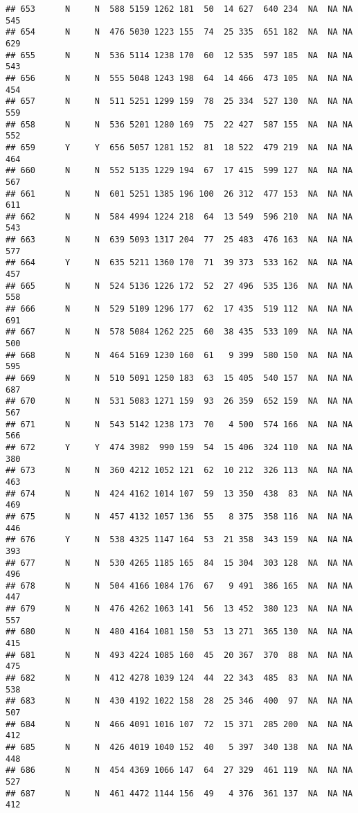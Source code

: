 \documentclass[]{article}
\begin{document}
\begin{verbatim}
## 653      N     N  588 5159 1262 181  50  14 627  640 234  NA  NA NA  545
## 654      N     N  476 5030 1223 155  74  25 335  651 182  NA  NA NA  629
## 655      N     N  536 5114 1238 170  60  12 535  597 185  NA  NA NA  543
## 656      N     N  555 5048 1243 198  64  14 466  473 105  NA  NA NA  454
## 657      N     N  511 5251 1299 159  78  25 334  527 130  NA  NA NA  559
## 658      N     N  536 5201 1280 169  75  22 427  587 155  NA  NA NA  552
## 659      Y     Y  656 5057 1281 152  81  18 522  479 219  NA  NA NA  464
## 660      N     N  552 5135 1229 194  67  17 415  599 127  NA  NA NA  567
## 661      N     N  601 5251 1385 196 100  26 312  477 153  NA  NA NA  611
## 662      N     N  584 4994 1224 218  64  13 549  596 210  NA  NA NA  543
## 663      N     N  639 5093 1317 204  77  25 483  476 163  NA  NA NA  577
## 664      Y     N  635 5211 1360 170  71  39 373  533 162  NA  NA NA  457
## 665      N     N  524 5136 1226 172  52  27 496  535 136  NA  NA NA  558
## 666      N     N  529 5109 1296 177  62  17 435  519 112  NA  NA NA  691
## 667      N     N  578 5084 1262 225  60  38 435  533 109  NA  NA NA  500
## 668      N     N  464 5169 1230 160  61   9 399  580 150  NA  NA NA  595
## 669      N     N  510 5091 1250 183  63  15 405  540 157  NA  NA NA  687
## 670      N     N  531 5083 1271 159  93  26 359  652 159  NA  NA NA  567
## 671      N     N  543 5142 1238 173  70   4 500  574 166  NA  NA NA  566
## 672      Y     Y  474 3982  990 159  54  15 406  324 110  NA  NA NA  380
## 673      N     N  360 4212 1052 121  62  10 212  326 113  NA  NA NA  463
## 674      N     N  424 4162 1014 107  59  13 350  438  83  NA  NA NA  469
## 675      N     N  457 4132 1057 136  55   8 375  358 116  NA  NA NA  446
## 676      Y     N  538 4325 1147 164  53  21 358  343 159  NA  NA NA  393
## 677      N     N  530 4265 1185 165  84  15 304  303 128  NA  NA NA  496
## 678      N     N  504 4166 1084 176  67   9 491  386 165  NA  NA NA  447
## 679      N     N  476 4262 1063 141  56  13 452  380 123  NA  NA NA  557
## 680      N     N  480 4164 1081 150  53  13 271  365 130  NA  NA NA  415
## 681      N     N  493 4224 1085 160  45  20 367  370  88  NA  NA NA  475
## 682      N     N  412 4278 1039 124  44  22 343  485  83  NA  NA NA  538
## 683      N     N  430 4192 1022 158  28  25 346  400  97  NA  NA NA  507
## 684      N     N  466 4091 1016 107  72  15 371  285 200  NA  NA NA  412
## 685      N     N  426 4019 1040 152  40   5 397  340 138  NA  NA NA  448
## 686      N     N  454 4369 1066 147  64  27 329  461 119  NA  NA NA  527
## 687      N     N  461 4472 1144 156  49   4 376  361 137  NA  NA NA  412

\end{verbatim}
\end{document}
